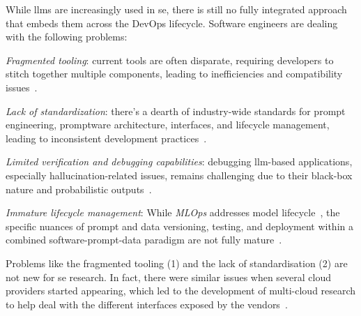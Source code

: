 \documentclass[manuscript,screen]{acmart}
\begin{document}
While \acp{llm} are increasingly used in \ac{se}, there is still no fully integrated approach that embeds them across the DevOps lifecycle.
Software engineers are dealing with the following problems:
\begin{enumerate*}
    \item \emph{Fragmented tooling}: current tools are often disparate, requiring developers to stitch together multiple components, leading to inefficiencies and compatibility issues~\cite{DBLP:conf/icse-seip/NaharKBPZB25}.
    \item \emph{Lack of standardization}: there's a dearth of industry-wide standards for prompt engineering, promptware architecture, interfaces, and lifecycle management, leading to inconsistent development practices~\cite{DBLP:journals/pacmse/LiangLRM25,lintang_sutawika_2024_14506035,DBLP:conf/icse-seip/NaharKBPZB25}.
    \item \emph{Limited verification and debugging capabilities}: debugging \ac{llm}-based applications, especially hallucination-related issues, remains challenging due to their black-box nature and probabilistic outputs~\cite{DBLP:conf/icse-seip/NaharKBPZB25,DBLP:journals/corr/abs-2503-00481}.
    \item \emph{Immature lifecycle management}: While \emph{MLOps} addresses model lifecycle~\cite{10.1145/3747346}, the specific nuances of prompt and data versioning, testing, and deployment within a combined software-prompt-data paradigm are not fully mature~\cite{DBLP:conf/icse-seip/NaharKBPZB25}.
\end{enumerate*}

Problems like the fragmented tooling (1) and the lack of standardisation (2) are not new for \ac{se} research.
In fact, there were similar issues when several cloud providers started appearing, which led to the development of multi-cloud research to help deal with the different interfaces exposed by the vendors~\cite{DBLP:conf/ecsa/BrogiCCDNGPPS16}.
\end{document}
